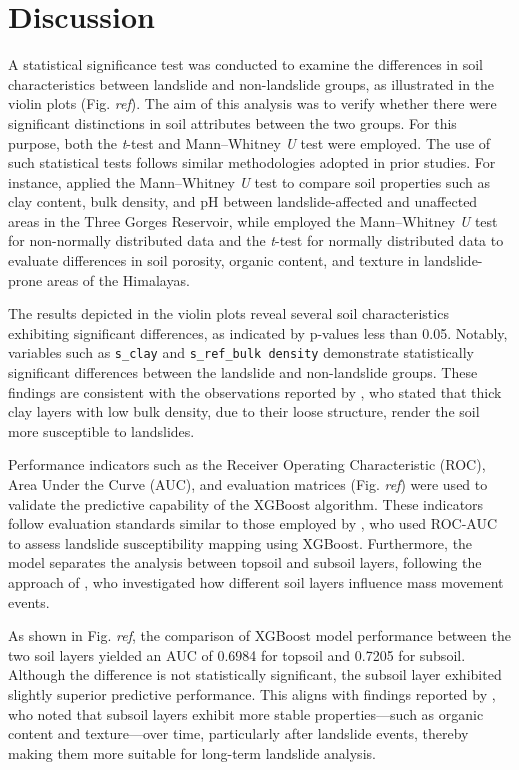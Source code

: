 \section{Discussion}

A statistical significance test was conducted to examine the differences in soil characteristics between landslide and non-landslide groups, as illustrated in the violin plots (Fig. \textit{ref}). The aim of this analysis was to verify whether there were significant distinctions in soil attributes between the two groups. For this purpose, both the \textit{t}-test and Mann–Whitney \textit{U} test were employed. The use of such statistical tests follows similar methodologies adopted in prior studies. For instance, \cite{b1} applied the Mann–Whitney \textit{U} test to compare soil properties such as clay content, bulk density, and pH between landslide-affected and unaffected areas in the Three Gorges Reservoir, while \cite{b2} employed the Mann–Whitney \textit{U} test for non-normally distributed data and the \textit{t}-test for normally distributed data to evaluate differences in soil porosity, organic content, and texture in landslide-prone areas of the Himalayas.

The results depicted in the violin plots reveal several soil characteristics exhibiting significant differences, as indicated by p-values less than 0.05. Notably, variables such as \texttt{s\_clay} and \texttt{s\_ref\_bulk density} demonstrate statistically significant differences between the landslide and non-landslide groups. These findings are consistent with the observations reported by \cite{b3}, who stated that thick clay layers with low bulk density, due to their loose structure, render the soil more susceptible to landslides.

Performance indicators such as the Receiver Operating Characteristic (ROC), Area Under the Curve (AUC), and evaluation matrices (Fig. \textit{ref}) were used to validate the predictive capability of the XGBoost algorithm. These indicators follow evaluation standards similar to those employed by \cite{b4}, who used ROC-AUC to assess landslide susceptibility mapping using XGBoost. Furthermore, the model separates the analysis between topsoil and subsoil layers, following the approach of \cite{b5}, who investigated how different soil layers influence mass movement events.

As shown in Fig. \textit{ref}, the comparison of XGBoost model performance between the two soil layers yielded an AUC of 0.6984 for topsoil and 0.7205 for subsoil. Although the difference is not statistically significant, the subsoil layer exhibited slightly superior predictive performance. This aligns with findings reported by \cite{b6}, who noted that subsoil layers exhibit more stable properties—such as organic content and texture—over time, particularly after landslide events, thereby making them more suitable for long-term landslide analysis.

